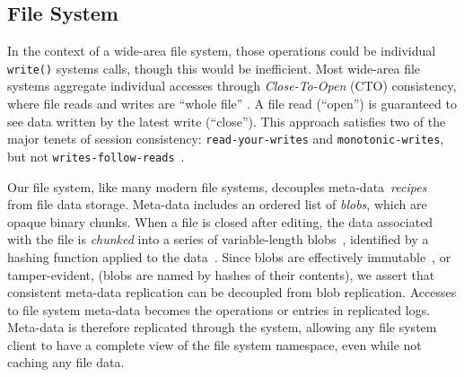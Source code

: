 \subsection{File System}
\label{ch05_file_system}

In the context of a wide-area file system, those operations could be individual
\texttt{write()} systems calls, though this would be inefficient.
Most wide-area file systems aggregate individual accesses through
\textit{Close-To-Open} (CTO) consistency, where file reads and writes are
``whole file'' \cite{afs,coda,lbfs}.
A file read (``open'') is guaranteed to see data written by the latest write
(``close'').
This approach satisfies two of the major tenets of session consistency:
\texttt{read-your-writes} and
\texttt{monotonic-writes}, but not
\texttt{writes-follow-reads}~\cite{bermbach_consistency_2013,anti_entropy,eventual_consistency}.

Our file system, like many modern file systems,
decouples
meta-data~\emph{recipes}~\cite{casper,gfs,hadoop_hdfs,pvfs,globalfs}
from file
data storage.
Meta-data includes an ordered list of \emph{blobs}, which are opaque binary chunks.
When a file is closed after editing, the data associated with the file is \emph{chunked} into a
series of variable-length blobs~\cite{lbfs}, identified by a hashing function applied to
the data~\cite{rabin_karp,rabin_fingerprint}.
Since blobs are effectively immutable~\cite{immutability_changes_everything}, or tamper-evident, (blobs are named by hashes of
their contents), we assert that consistent meta-data replication can be decoupled from blob
replication.
Accesses to file system meta-data becomes the operations or entries in replicated logs.
Meta-data is therefore replicated through the system, allowing any file
system client to have a complete view of the file system namespace, even while
not caching any file data.

